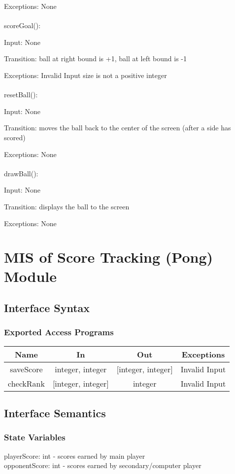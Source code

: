 \documentclass[12pt, titlepage]{article}
\begin{document}
		Exceptions: None\\	
		\\
		scoreGoal():
		
		Input: None
		
		Transition: ball at right bound is +1, ball at left bound is -1
		
		Exceptions: Invalid Input size is not a positive integer\\
		\\
		resetBall():
		
		Input: None
		
		Transition: moves the ball back to the center of the screen (after a side has scored)
		
		Exceptions: None\\
		\\
		drawBall():
	    
		Input: None
		
		Transition: displays the ball to the screen
		
		Exceptions: None

\section{MIS of Score Tracking (Pong) Module}
		\subsection{Interface Syntax}
		\subsubsection{Exported Access Programs}
		\begin{tabular}[pos]{|c|c|c|c|}
			\hline
			\textbf{Name}& \textbf{In} & \textbf{Out} & \textbf{Exceptions} \\ \hline
			saveScore & integer, integer & [integer, integer] & Invalid Input \\ \hline
			checkRank & [integer, integer] & integer & Invalid Input \\ \hline
		\end{tabular}
		
		\subsection{Interface Semantics}
		\subsubsection{State Variables}
		playerScore: int - scores earned by main player \\
		opponentScore: int - scores earned by secondary/computer player
		
\end{document}
